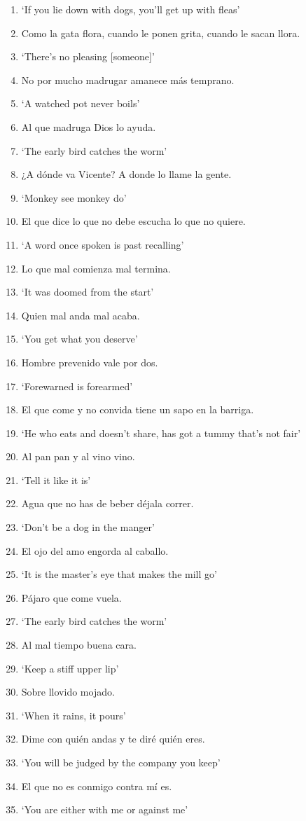 \documentclass[output=paper,colorlinks,citecolor=brown,draftmode]{langscibook}
\begin{document}
\begin{enumerate}[topsep=0pt,itemsep=-1ex,partopsep=1ex,parsep=1ex]
\item[]  ‘If you lie down with dogs, you'll get up with fleas’
\item Como la gata flora, cuando le ponen grita, cuando le sacan llora.
\item[]  ‘There’s no pleasing [someone]’
\item No por mucho madrugar amanece m\'as temprano.
\item[]  ‘A watched pot never boils’
\item Al que madruga Dios lo ayuda.
\item[]  ‘The early bird catches the worm’
\item¿A dónde va Vicente? A donde lo llame la gente.
\item[]  ‘Monkey see monkey do’
\item El que dice lo que no debe escucha lo que no quiere.
\item[]  ‘A word once spoken is past recalling’
\item Lo que mal comienza mal termina.
\item[]  ‘It was doomed from the start’
\item Quien mal anda mal acaba.
\item[]  ‘You get what you deserve’
\item Hombre prevenido vale por dos.
\item[]  ‘Forewarned is forearmed’
\item El que come y no convida tiene un sapo en la barriga.
\item[]  ‘He who eats and doesn't share, has got a tummy that's not fair’
\item Al pan pan y al vino vino.
\item[]  ‘Tell it like it is’
\largerpage
\item Agua que no has de beber d\'ejala correr.
\item[]  ‘Don’t be a dog in the manger’
\item El ojo del amo engorda al caballo.
\item[]  ‘It is the master's eye that makes the mill go’
\item Pájaro que come vuela.
\item[]  ‘The early bird catches the worm’
\item Al mal tiempo buena cara.
\item[]  ‘Keep a stiff upper lip’
\item Sobre llovido mojado.
\item[]  ‘When it rains, it pours’
\item Dime con qui\'en andas y te dir\'e qui\'en eres.
\item[]  ‘You will be judged by the company you keep’
\item El que no es conmigo contra m\'i es.
\item[]  ‘You are either with me or against me’

\end{enumerate}


\printbibliography[heading=subbibliography,notkeyword=this]
\end{document}
